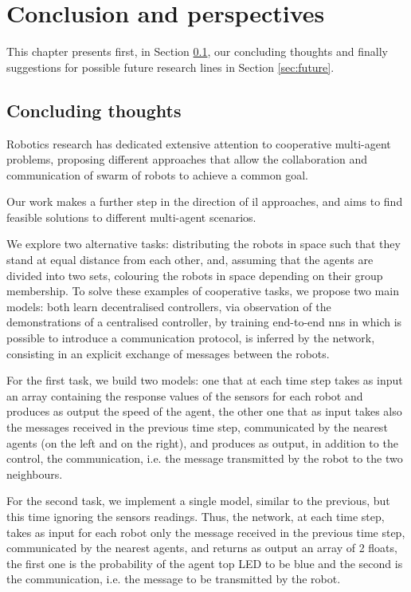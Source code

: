 \chapter*{Conclusion and perspectives}
\label{chap:concl}
 
This chapter presents first, in Section \ref{sec:concl}, our concluding thoughts and 
finally suggestions for possible future research lines in Section \ref{sec:future}.

\section{Concluding thoughts}
\label{sec:concl}
Robotics research has dedicated extensive attention to cooperative multi-agent 
problems, proposing different approaches that allow the collaboration and 
communication of swarm of robots to achieve a common goal.

Our work makes a further step in the direction of \gls{il} approaches, and aims to 
find feasible solutions to different multi-agent scenarios.

We explore two alternative tasks: distributing the robots in space such that they 
stand at equal distance from each other, and, assuming that the agents are 
divided into two sets, colouring the robots in space depending on their group 
membership.
To solve these examples of cooperative tasks, we propose two main models: both 
learn decentralised controllers, via observation of the demonstrations of a 
centralised controller, by training end-to-end \glspl{nn} in which is possible to
introduce a communication protocol, is inferred by the network, consisting in an 
explicit exchange of messages between the robots.

For the first task, we build two models: one that at each time step takes as input 
an array containing the response values of the sensors for each robot and 
produces as output the speed of the agent, the other one that as input takes also 
the messages received in the previous time step, communicated by the nearest 
agents (on the left and on the right), and produces as output, in addition to the 
control, the communication, i.e. the message transmitted by the robot to the two 
neighbours. 

For the second task, we implement a single model, similar to the previous, but this 
time ignoring the sensors readings. Thus, the network, at each time step, takes as 
input for each robot only the message received in the previous time step, 
communicated by the nearest agents, and returns as output an array of 2 floats, 
the first one is the probability of the agent top LED to be blue and the second is 
the communication, i.e. the message to be transmitted by the robot.

